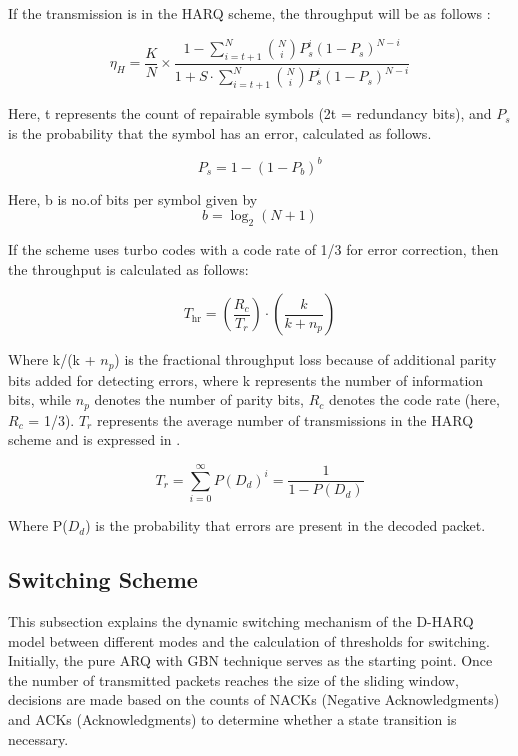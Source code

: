 \documentclass[sn-mathphys-num]{sn-jnl}
\theoremstyle{thmstyleone}
\theoremstyle{thmstyletwo}%
\theoremstyle{thmstylethree}%
\begin{document}
If the transmission is in the HARQ scheme, the throughput \cite{r21} will be as follows :

\begin{equation}\label{10}
    \eta_H = \frac{K}{N} \times \frac{1 - \sum_{i=t+1}^{N} \binom{N}{i} P_s^i (1-P_s)^{N-i}}{1 + S \cdot \sum_{i=t+1}^{N} \binom{N}{i} P_s^i (1-P_s)^{N-i}}
\end{equation}

Here, t represents the count of repairable symbols (2t = redundancy bits), and ${P}_s$ is the probability that the symbol has an error, calculated as follows.
 
\begin{equation}\label{11}
    P_s = 1 - (1 - P_b)^b
\end{equation}

Here, b is no.of bits per symbol given by
\begin{equation}\label{9}
    b = \log_2(N+1)
\end{equation}

If the scheme uses turbo codes with a code rate of 1/3 for error correction, then the throughput is calculated as follows:

\begin{equation}
    T_{\text{hr}} = \left(\frac{R_{c}}{T_{r}}\right) \cdot \left(\frac{k}{k + n_{p}}\right)
\end{equation}

Where k/(k + ${n}_p$) is the fractional throughput loss because of additional parity bits added for detecting errors, where k represents the number of information bits, while  ${n}_p$ denotes the number of parity bits, ${R}_c$ denotes the code rate (here, ${R}_c$ =  1/3). ${T}_r$ represents the average number of transmissions in the HARQ scheme and is expressed in \cite{r19}.

\begin{equation}
    T_{r} = \sum_{i=0}^{\infty} P(D_{d})^{i} = \frac{1}{1 - P(D_{d})}
\end{equation} 

Where P(${D}_d$) is the probability that errors are present in the decoded packet.

\subsection{Switching Scheme} \label{s3.3}

This subsection explains the dynamic switching mechanism of the D-HARQ model between different modes and the calculation of thresholds for switching. Initially, the pure ARQ with GBN technique serves as the starting point. Once the number of transmitted packets reaches the size of the sliding window, decisions are made based on the counts of NACKs (Negative Acknowledgments) and ACKs (Acknowledgments) to determine whether a state transition is necessary.
\end{document}
